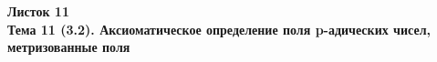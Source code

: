 \documentclass[a4paper, 11pt]{article}
\begin{document}
\begin{center} \Large \bf Листок 11\\ Тема 11 (3.2). Аксиоматическое определение поля p-адических чисел, метризованные поля \end{center}


\end{document}
